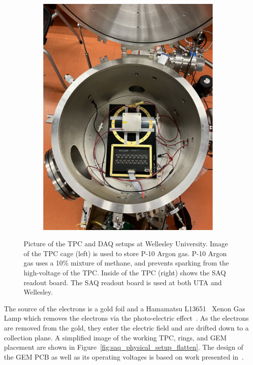 \begin{figure}[]
\begin{subfigure}{.5\textwidth}
  \includegraphics[width=\textwidth]{images/saq_wellesley_tpc_daq.jpg}
  \caption{}
\end{subfigure}
\caption{Picture of the TPC and DAQ setups at Wellesley University.
Image of the TPC cage (left) is used to store P-10 Argon gas. P-10 Argon gas uses a 10\% mixture of methane, and prevents sparking from the high-voltage of the TPC.
Inside of the TPC (right) shows the SAQ readout board.
The SAQ readout board is used at both UTA and Wellesley.
}
\label{fig:wellesley_tpc}
\end{figure}

The source of the electrons is a gold foil and a Hamamatsu L13651~\citep{hamamatsu_tls1023e} Xenon Gas Lamp which removes the electrons via the photo-electric effect~\citep{https://doi.org/10.1002/andp.19053220607}.
As the electrons are removed from the gold, they enter the electric field and are drifted down to a collection plane.
A simplified image of the working TPC, rings, and GEM placement are shown in Figure~\ref{fig:saq_physical_setup_flatten}.
The design of the GEM PCB as well as its operating voltages is based on work presented in~\citep{THORPE2023167438}.

